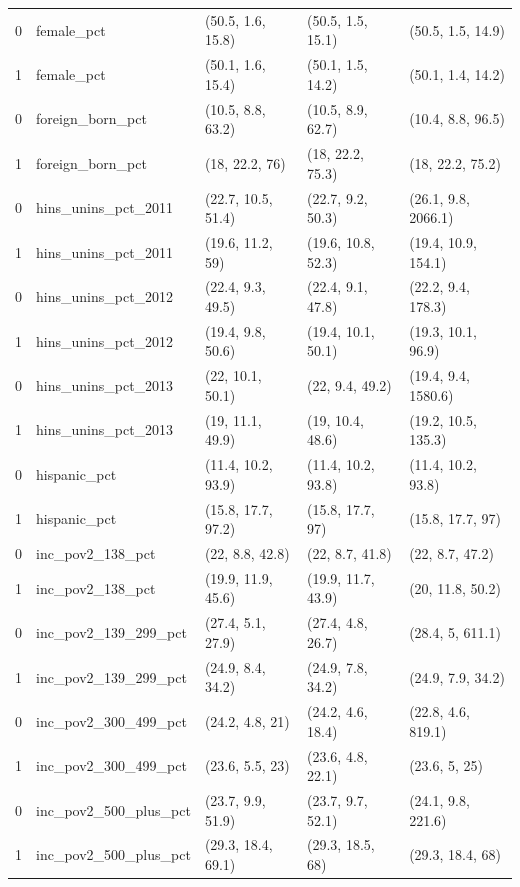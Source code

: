 \documentclass[aoas]{imsart}
\theoremstyle{plain}
\theoremstyle{remark}
\begin{document}
\begin{appendix}
\begin{table}[ht]
\begin{tabular}{rllll}
  0 & female\_pct & (50.5, 1.6, 15.8) & (50.5, 1.5, 15.1) & (50.5, 1.5, 14.9) \\ 
  1 & female\_pct & (50.1, 1.6, 15.4) & (50.1, 1.5, 14.2) & (50.1, 1.4, 14.2) \\ 
  0 & foreign\_born\_pct & (10.5, 8.8, 63.2) & (10.5, 8.9, 62.7) & (10.4, 8.8, 96.5) \\ 
  1 & foreign\_born\_pct & (18, 22.2, 76) & (18, 22.2, 75.3) & (18, 22.2, 75.2) \\ 
  0 & hins\_unins\_pct\_2011 & (22.7, 10.5, 51.4) & (22.7, 9.2, 50.3) & (26.1, 9.8, 2066.1) \\ 
  1 & hins\_unins\_pct\_2011 & (19.6, 11.2, 59) & (19.6, 10.8, 52.3) & (19.4, 10.9, 154.1) \\ 
  0 & hins\_unins\_pct\_2012 & (22.4, 9.3, 49.5) & (22.4, 9.1, 47.8) & (22.2, 9.4, 178.3) \\ 
  1 & hins\_unins\_pct\_2012 & (19.4, 9.8, 50.6) & (19.4, 10.1, 50.1) & (19.3, 10.1, 96.9) \\ 
  0 & hins\_unins\_pct\_2013 & (22, 10.1, 50.1) & (22, 9.4, 49.2) & (19.4, 9.4, 1580.6) \\ 
  1 & hins\_unins\_pct\_2013 & (19, 11.1, 49.9) & (19, 10.4, 48.6) & (19.2, 10.5, 135.3) \\ 
    0 & hispanic\_pct & (11.4, 10.2, 93.9) & (11.4, 10.2, 93.8) & (11.4, 10.2, 93.8) \\ 
  1 & hispanic\_pct & (15.8, 17.7, 97.2) & (15.8, 17.7, 97) & (15.8, 17.7, 97) \\ 
  0 & inc\_pov2\_138\_pct & (22, 8.8, 42.8) & (22, 8.7, 41.8) & (22, 8.7, 47.2) \\ 
  1 & inc\_pov2\_138\_pct & (19.9, 11.9, 45.6) & (19.9, 11.7, 43.9) & (20, 11.8, 50.2) \\ 
  0 & inc\_pov2\_139\_299\_pct & (27.4, 5.1, 27.9) & (27.4, 4.8, 26.7) & (28.4, 5, 611.1) \\ 
  1 & inc\_pov2\_139\_299\_pct & (24.9, 8.4, 34.2) & (24.9, 7.8, 34.2) & (24.9, 7.9, 34.2) \\ 
  0 & inc\_pov2\_300\_499\_pct & (24.2, 4.8, 21) & (24.2, 4.6, 18.4) & (22.8, 4.6, 819.1) \\ 
  1 & inc\_pov2\_300\_499\_pct & (23.6, 5.5, 23) & (23.6, 4.8, 22.1) & (23.6, 5, 25) \\ 
  0 & inc\_pov2\_500\_plus\_pct & (23.7, 9.9, 51.9) & (23.7, 9.7, 52.1) & (24.1, 9.8, 221.6) \\ 
  1 & inc\_pov2\_500\_plus\_pct & (29.3, 18.4, 69.1) & (29.3, 18.5, 68) & (29.3, 18.4, 68) \\ 

\end{tabular}
\end{table}
\end{appendix}
\end{document}
